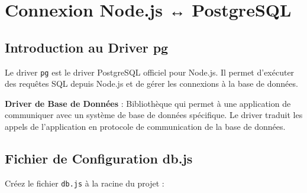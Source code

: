 \chapter{Connexion Node.js ↔ PostgreSQL}

\section{Introduction au Driver pg}

Le driver \texttt{pg} est le driver PostgreSQL officiel pour Node.js. Il permet d'exécuter des requêtes SQL depuis Node.js et de gérer les connexions à la base de données.

\begin{definitionbox}
    \textbf{Driver de Base de Données} : Bibliothèque qui permet à une application de communiquer avec un système de base de données spécifique. Le driver traduit les appels de l'application en protocole de communication de la base de données.
\end{definitionbox}

\section{Fichier de Configuration db.js}

Créez le fichier \texttt{db.js} à la racine du projet :


